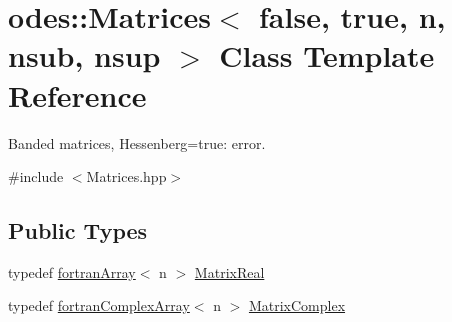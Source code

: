 \hypertarget{classodes_1_1Matrices_3_01false_00_01true_00_01n_00_01nsub_00_01nsup_01_4}{\section{odes\-:\-:Matrices$<$ false, true, n, nsub, nsup $>$ Class Template Reference}
\label{classodes_1_1Matrices_3_01false_00_01true_00_01n_00_01nsub_00_01nsup_01_4}
}


Banded matrices, Hessenberg=true\-: error.  




{\ttfamily \#include $<$Matrices.\-hpp$>$}

\subsection*{Public Types}
\begin{DoxyCompactItemize}
\item 
typedef \hyperlink{classodes_1_1fortranArray}{fortran\-Array}$<$ n $>$ \hyperlink{classodes_1_1Matrices_3_01false_00_01true_00_01n_00_01nsub_00_01nsup_01_4_a63af1e92e4c06d6986909d7af6a9c0b9}{Matrix\-Real}
\item 
typedef \hyperlink{classodes_1_1fortranComplexArray}{fortran\-Complex\-Array}$<$ n $>$ \hyperlink{classodes_1_1Matrices_3_01false_00_01true_00_01n_00_01nsub_00_01nsup_01_4_ab1d809758e20fa3ef210700989a47fa0}{Matrix\-Complex}
\end{DoxyCompactItemize}
